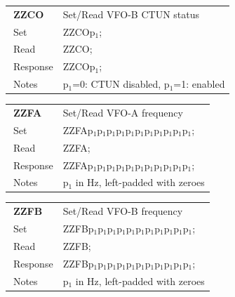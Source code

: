 \documentclass[12pt]{book}
\begin{document}
\begin{center}
\begin{tabular}{|p{2cm}|p{11cm}|}
\toprule
$\phantom{\Big|}$\textbf{\large ZZCO} & Set/Read VFO-B CTUN status \\\cline{1-2}
$\phantom{\Big|}${\large Set} & {ZZCOp$_1$;} \\\hline
$\phantom{\Big|}${\large Read} & {ZZCO;} \\\hline
$\phantom{\Big|}${\large Response} & {ZZCOp$_1$;} \\\hline
$\phantom{\Big|}${\large Notes} & \multicolumn{1}{|p{11cm}|}{p$_1$=0: CTUN disabled, p$_1$=1: enabled} \\
\bottomrule
\end{tabular}
\end{center}

\begin{center}
\begin{tabular}{|p{2cm}|p{11cm}|}
\toprule
$\phantom{\Big|}$\textbf{\large ZZFA} & Set/Read VFO-A frequency \\\cline{1-2}
$\phantom{\Big|}${\large Set} & {ZZFAp$_1$p$_1$p$_1$p$_1$p$_1$p$_1$p$_1$p$_1$p$_1$p$_1$p$_1$;} \\\hline
$\phantom{\Big|}${\large Read} & {ZZFA;} \\\hline
$\phantom{\Big|}${\large Response} & {ZZFAp$_1$p$_1$p$_1$p$_1$p$_1$p$_1$p$_1$p$_1$p$_1$p$_1$p$_1$;} \\\hline
$\phantom{\Big|}${\large Notes} & \multicolumn{1}{|p{11cm}|}{p$_1$ in Hz, left-padded with zeroes} \\
\bottomrule
\end{tabular}
\end{center}

\begin{center}
\begin{tabular}{|p{2cm}|p{11cm}|}
\toprule
$\phantom{\Big|}$\textbf{\large ZZFB} & Set/Read VFO-B frequency \\\cline{1-2}
$\phantom{\Big|}${\large Set} & {ZZFBp$_1$p$_1$p$_1$p$_1$p$_1$p$_1$p$_1$p$_1$p$_1$p$_1$p$_1$;} \\\hline
$\phantom{\Big|}${\large Read} & {ZZFB;} \\\hline
$\phantom{\Big|}${\large Response} & {ZZFBp$_1$p$_1$p$_1$p$_1$p$_1$p$_1$p$_1$p$_1$p$_1$p$_1$p$_1$;} \\\hline
$\phantom{\Big|}${\large Notes} & \multicolumn{1}{|p{11cm}|}{p$_1$ in Hz, left-padded with zeroes} \\
\bottomrule
\end{tabular}
\end{center}
\end{document}
